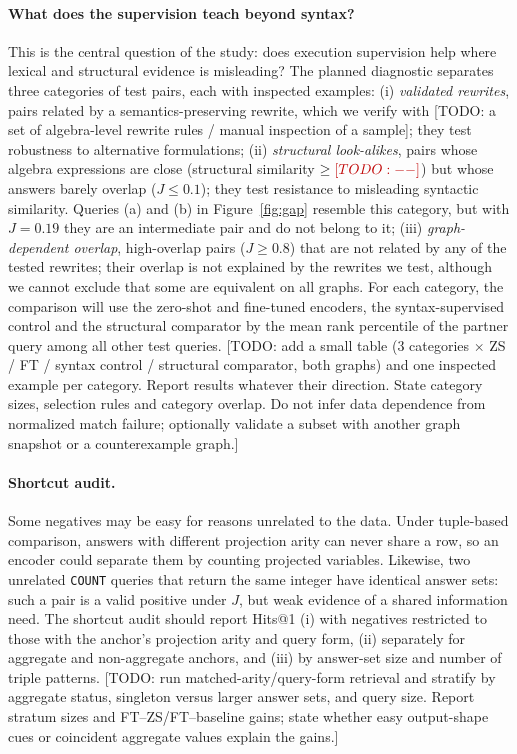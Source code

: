 \documentclass[runningheads]{llncs}
\newcommand{\hp}[1]{{\color{red!75!black}#1}}
\begin{document}
\paragraph{What does the supervision teach beyond syntax?}
This is the central question of the study: does execution supervision help
where lexical and structural evidence is misleading? The planned diagnostic separates three
categories of test pairs, each with inspected examples:
(i) \emph{validated rewrites}, pairs related by a semantics-preserving
rewrite, which we verify with \hp{[TODO: a set of algebra-level rewrite rules
/ manual inspection of a sample]}; they test robustness to alternative
formulations;
(ii) \emph{structural look-alikes}, pairs whose algebra expressions are
close (structural similarity $\geq \hp{[TODO: --]}$) but whose answers barely
overlap ($J \leq 0.1$); they test resistance to misleading syntactic
similarity. Queries (a) and (b) in Figure~\ref{fig:gap} resemble this
category, but with $J = 0.19$ they are an intermediate pair and do not belong
to it;
(iii) \emph{graph-dependent overlap}, high-overlap pairs ($J \geq 0.8$) that
are not related by any of the tested rewrites; their overlap is not explained
by the rewrites we test, although we cannot exclude that some are equivalent
on all graphs.
For each category, the comparison will use the zero-shot and fine-tuned encoders, the
syntax-supervised control and the structural comparator by the mean rank
percentile of the partner query among all other test queries.
\hp{[TODO: add a small table (3 categories $\times$ ZS / FT / syntax control /
structural comparator, both graphs) and one inspected example per category.
Report results whatever their direction. State category sizes, selection
rules and category overlap. Do not infer data dependence from normalized
match failure; optionally validate a subset with another graph snapshot or
a counterexample graph.]}

\paragraph{Shortcut audit.}
Some negatives may be easy for reasons unrelated to the data. Under
tuple-based comparison, answers with different projection arity can never
share a row, so an encoder could separate them by counting projected
variables. Likewise, two unrelated \texttt{COUNT} queries that return the same
integer have identical answer sets: such a pair is a valid positive under $J$,
but weak evidence of a shared information need. The shortcut audit should report Hits@1
(i) with negatives restricted to those with the anchor's projection arity and
query form, (ii) separately for aggregate and non-aggregate anchors, and
(iii) by answer-set size and number of triple patterns.
\hp{[TODO: run matched-arity/query-form retrieval and stratify by aggregate
status, singleton versus larger answer sets, and query size. Report stratum
sizes and FT--ZS/FT--baseline gains; state whether easy output-shape cues or
coincident aggregate values explain the gains.]}
\end{document}

